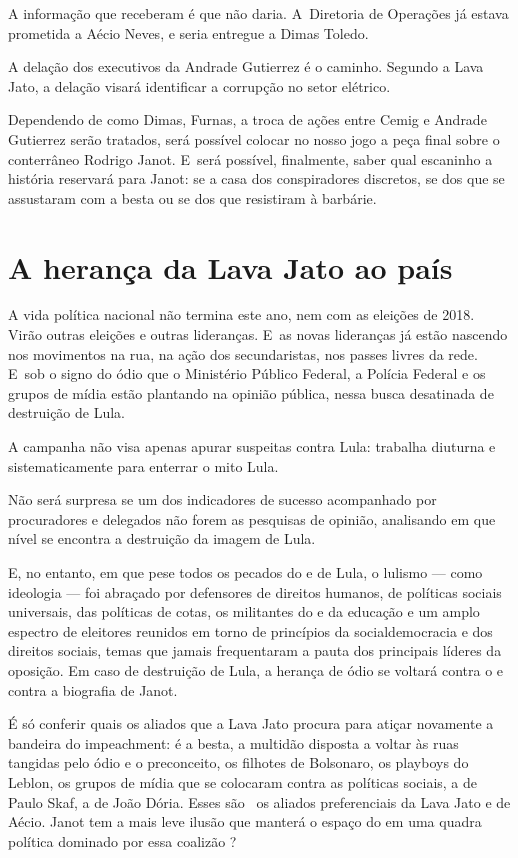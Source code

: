A informação que receberam é que não daria. A~Diretoria de Operações já
estava prometida a Aécio Neves, e seria entregue a Dimas Toledo.

A delação dos executivos da Andrade Gutierrez é o caminho. Segundo a
Lava Jato, a delação visará identificar a corrupção no setor elétrico.~

Dependendo de como Dimas, Furnas, a troca de ações entre Cemig e Andrade
Gutierrez serão tratados, será possível colocar no nosso jogo a peça
final sobre o conterrâneo Rodrigo Janot. E~será possível, finalmente,
saber qual escaninho a história reservará para Janot: se a casa dos
conspiradores discretos, se dos que se assustaram com a besta ou se dos
que resistiram à barbárie.

\section{A herança da Lava Jato ao país}

A vida política nacional não termina este ano, nem com as eleições de
2018. Virão outras eleições e outras lideranças. E~as novas lideranças
já estão nascendo nos movimentos na rua, na ação dos secundaristas, nos
passes livres da rede. E~sob o signo do ódio que o Ministério Público
Federal, a Polícia Federal e os grupos de mídia estão plantando na
opinião pública, nessa busca desatinada de destruição de Lula.

A campanha não visa apenas apurar suspeitas contra Lula: trabalha
diuturna e sistematicamente para enterrar o mito Lula.

Não será surpresa se um dos indicadores de sucesso acompanhado por
procuradores e delegados não forem as pesquisas de opinião, analisando
em que nível se encontra a destruição da imagem de Lula.

E, no entanto, em que pese todos os pecados do  e de Lula, o lulismo
--- como ideologia --- foi abraçado por defensores de direitos humanos,
de políticas sociais universais, das políticas de cotas, os militantes
do  e da educação e um amplo espectro de eleitores reunidos em torno
de princípios da socialdemocracia e dos direitos sociais, temas que
jamais frequentaram a pauta dos principais líderes da oposição. Em caso
de destruição de Lula, a herança de ódio se voltará contra o  e
contra a biografia de Janot.

É só conferir quais os aliados que a Lava Jato procura para atiçar
novamente a bandeira do impeachment: é a besta, a multidão disposta a
voltar às ruas tangidas pelo ódio e o preconceito, os filhotes de
Bolsonaro, os playboys do Leblon, os grupos de mídia que se colocaram
contra as políticas sociais, a  de Paulo Skaf, a  de João
Dória. Esses são ~os aliados preferenciais da Lava Jato e de Aécio.
Janot tem a mais leve ilusão que manterá o espaço do  em uma quadra
política dominado por essa coalizão ?

